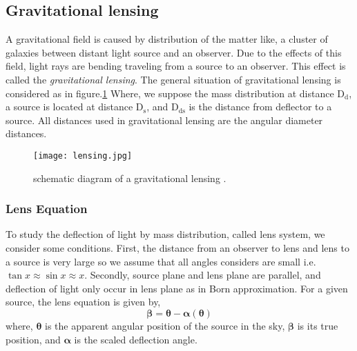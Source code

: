 \subsection{Gravitational lensing}
A gravitational field is caused by distribution of the matter like, a cluster of galaxies between distant light source and an observer. Due to the effects of this field, light rays are bending traveling from a source to an observer. This effect is called the \textit{gravitational lensing}. The general situation of gravitational lensing is considered as in figure.\ref{Fig:lensing} Where, we suppose the mass distribution at distance $ \text{D}_{\text{d}}$, a source is located at distance $ \text{D}_{\text{s}} $, and $ \text{D}_{\text{ds}}$ is the distance from deflector to a source. All distances used in gravitational lensing are the angular diameter distances.
\begin{figure}[H]
	\centering
	\texttt{[image: lensing.jpg]}
	\caption{schematic diagram of a gravitational lensing \cite{manual}.}%
	\label{Fig:lensing}
\end{figure}

\subsubsection{Lens Equation}
To study the deflection of light by mass distribution, called lens system, we consider some conditions. First, the distance from an observer to lens and lens to a source is very large so we assume that all angles considers are small i.e. $\tan x \approx \sin x \approx x$. Secondly, source plane and lens plane are parallel, and deflection of light only occur in lens plane as in Born approximation.
For a given source, the lens equation is given by,
\begin{equation}
\pmb\beta =\pmb\theta - \pmb\alpha (\pmb\theta)
\label{LEquation}
\end{equation}
\noindent
where, $\pmb\theta$ is the apparent angular position of the source in the sky, $\pmb\beta$ is its true position, and $\pmb\alpha $ is the scaled deflection angle.


